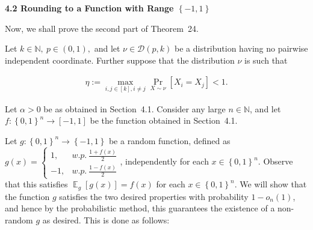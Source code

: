 \documentclass[10pt,a4paper]{article}
\begin{document}
\par\medskip\noindent\textbf{
4.2 Rounding to a Function with Range $\left\{-1,1\right\}$
}\par




Now, we shall prove the second part of Theorem 24.\par




Let $k\in\mathbb{N},\ p\in(0,1),$ and let $\nu\in\mathcal{D}(p,k)$ be a distribution having no pairwise independent coordinate.
Further suppose that the distribution $\nu$ is such that\par


\[\begin{gathered}
\eta:=\max_{i,j\in[k],i\not=j}\Pr_{X\sim\nu}\left[X_{i}=X_{j}\right]<1.
\end{gathered}\]


Let $\alpha>0$ be as obtained in Section 4.1.
Consider any large $n\in\mathbb{N}$, and let $f:\left\{0,1\right\}^{n}\to[-1,1]$ be the function obtained in Section 4.1.\par




Let $g:\left\{0,1\right\}^{n}\to\left\{-1,1\right\}$ be a random function, defined as $g(x)=\begin{cases}1,&w.p.\ \frac{1+f(x)}{2}\\
-1,&w.p.\ \frac{1-f(x)}{2}\end{cases}$, independently for each $x\in\left\{0,1\right\}^{n}$.
Observe that this satisfies $\mathop{\mathbb{E}}_{g}\left[g(x)\right]=f(x)$ for each $x\in\left\{0,1\right\}^{n}$.
We will show that the function $g$ satisfies the two desired properties with probability $1-o_{n}(1)$, and hence by the probabilistic method, this guarantees the existence of a non-random $g$ as desired.
This is done as follows:\par
\end{document}
